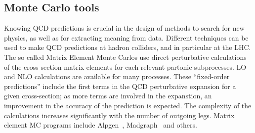 \subsection{Monte Carlo tools}\label{sec:MCtools}


Knowing QCD predictions is crucial in the design of methods to search for new physics, as well as for extracting meaning from data. Different techniques can be used to make QCD predictions at hadron colliders, and in particular at the LHC. The so called Matrix Element Monte Carlos use direct perturbative calculations of the cross-section matrix elements  %
for each relevant partonic subprocesses. LO and NLO calculations are available for many processes.   These ``fixed-order predictions'' include the first terms in the QCD perturbative expansion for a given cross-section; as more terms are involved in the expanstion, an improvement in the accuracy of the prediction is expected.  The complexity of the calculations increases significantly with the number of outgoing legs. %
Matrix element MC programs include {\sc Alpgen}~\cite{ALPGEN}, {\sc Madgraph}~\cite{MADGRAPH} and others.


